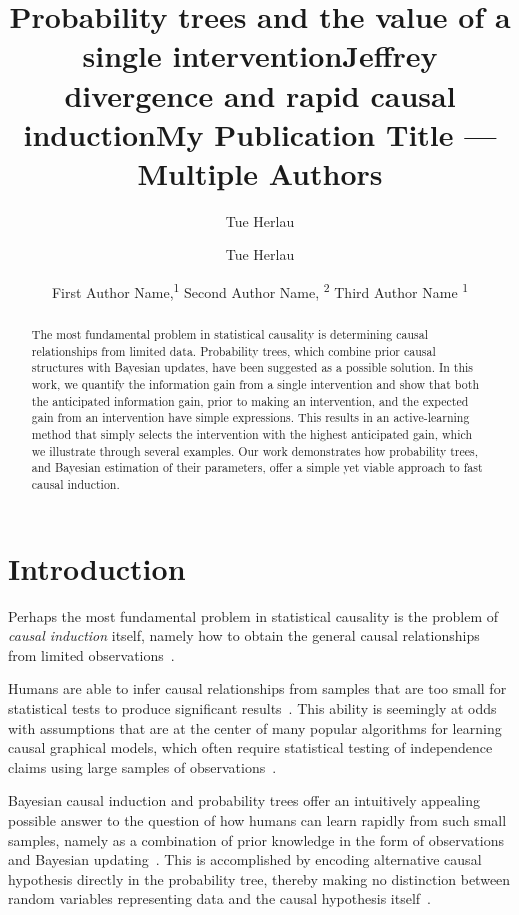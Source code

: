 \documentclass[letterpaper]{article} %
\title{Probability trees and the value of a single intervention}
\author {
	Tue Herlau%
}
\title{Jeffrey divergence and rapid causal induction}
\author {
Tue Herlau
}
\title{My Publication Title --- Multiple Authors}
\author {
    First Author Name,\textsuperscript{\rm 1}
    Second Author Name, \textsuperscript{\rm 2}
    Third Author Name \textsuperscript{\rm 1}
}
\begin{document}
\maketitle



\begin{abstract}
The most fundamental problem in statistical causality is determining causal relationships from limited data. Probability trees, which combine prior causal structures with Bayesian updates,
have been suggested as a possible solution.
In this work, we quantify the information gain from a single intervention and show that both the anticipated information gain, prior to making an intervention, and the expected gain from an intervention have simple expressions. This results in an active-learning method that simply selects the intervention with the highest anticipated gain, which we illustrate through several examples. Our work demonstrates how probability trees, and Bayesian estimation of their parameters, offer a simple yet viable approach to fast causal induction.
\end{abstract}

\noindent
\section{Introduction}

Perhaps the most fundamental problem in statistical causality is the problem of \emph{causal induction} itself, namely how to obtain the general causal relationships from limited observations~\citep{griffiths2007mere}.


Humans are able to infer causal relationships from samples that are too small for statistical tests to produce significant results~\cite{gopnik2001causal}. This ability is seemingly at odds with assumptions that are at the center of many popular algorithms for learning causal graphical models, which often require statistical testing of independence claims using large samples of observations~\cite{spirtes2000causation,pearl2000models,janzing2012information}. %








Bayesian causal induction and probability trees offer an intuitively appealing possible answer to the question of how humans can learn rapidly from such small samples, namely as a combination of prior knowledge in the form of observations and Bayesian updating~\cite{griffiths2009theory,ortega2015subjectivity}. This is accomplished by encoding alternative causal hypothesis directly in the probability tree, thereby making no distinction between random variables representing data and the causal hypothesis itself~\cite{genewein2020algorithms,shafer1996art}. %
\end{document}
